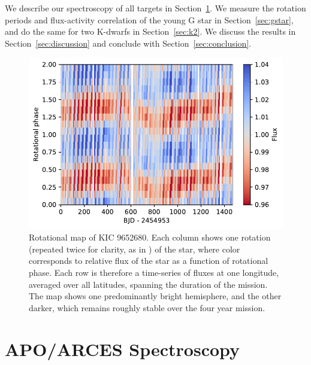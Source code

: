 We describe our spectroscopy of all targets in Section~\ref{sec:spectroscopy}. We measure the rotation periods and flux-activity correlation of the young G star in Section~\ref{sec:gstar}, and do the same for two K-dwarfs in Section~\ref{sec:k2}. We discuss the results in Section~\ref{sec:discussion} and conclude with Section~\ref{sec:conclusion}.

\begin{figure}
    \centering
    \includegraphics[scale=0.65]{nephelion/rotation_map.pdf}
    \caption{Rotational map of KIC 9652680. Each column shows one rotation (repeated twice for clarity, as in \citep{Davenport2015}) of the star, where color corresponds to relative flux of the star as a function of rotational phase. Each row is therefore a time-series of fluxes at one longitude, averaged over all latitudes, spanning the duration of the \kepler mission. The map shows one predominantly bright hemisphere, and the other darker, which remains roughly stable over the four year \kepler mission.}
    \label{fig:rotation}
\end{figure}

\section{APO/ARCES Spectroscopy} \label{sec:spectroscopy}


